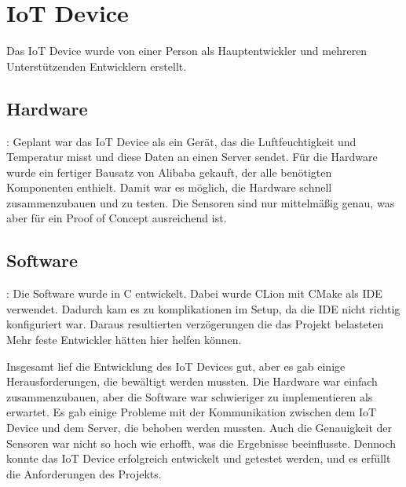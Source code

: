 \section{IoT Device}
Das IoT Device wurde von einer Person als Hauptentwickler und mehreren Unterstützenden Entwicklern erstellt.
    \subsection{Hardware}:
    Geplant war das IoT Device als ein Gerät, das die Luftfeuchtigkeit und Temperatur misst und diese Daten an einen Server sendet.
    Für die Hardware wurde ein fertiger Bausatz von Alibaba gekauft, der alle benötigten Komponenten enthielt. Damit war es möglich, die Hardware schnell zusammenzubauen und zu testen.
    Die Sensoren sind nur mittelmäßig genau, was aber für ein Proof of Concept ausreichend ist.
    \subsection{Software}:
    Die Software wurde in C entwickelt. Dabei wurde CLion mit CMake als IDE verwendet.
    Dadurch kam es zu komplikationen im Setup, da die IDE nicht richtig konfiguriert war. Daraus resultierten verzögerungen die das Projekt belasteten
    Mehr feste Entwickler hätten hier helfen können.

Insgesamt lief die Entwicklung des IoT Devices gut, aber es gab einige Herausforderungen, die bewältigt werden mussten.
    Die Hardware war einfach zusammenzubauen, aber die Software war schwieriger zu implementieren als erwartet.
    Es gab einige Probleme mit der Kommunikation zwischen dem IoT Device und dem Server, die behoben werden mussten.
    Auch die Genauigkeit der Sensoren war nicht so hoch wie erhofft, was die Ergebnisse beeinflusste.
    Dennoch konnte das IoT Device erfolgreich entwickelt und getestet werden, und es erfüllt die Anforderungen des Projekts.
    